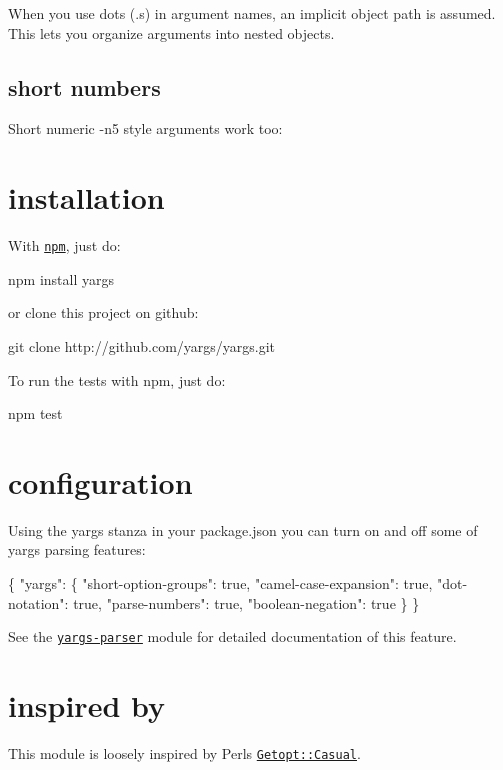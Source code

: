 When you use dots ({\ttfamily .}s) in argument names, an implicit object path is assumed. This lets you organize arguments into nested objects. 


\subsection*{short numbers }

Short numeric {\ttfamily -\/n5} style arguments work too\+: 


\section*{installation }

With \href{https://github.com/npm/npm}{\tt npm}, just do\+: \begin{DoxyVerb}npm install yargs
\end{DoxyVerb}


or clone this project on github\+: \begin{DoxyVerb}git clone http://github.com/yargs/yargs.git
\end{DoxyVerb}


To run the tests with npm, just do\+: \begin{DoxyVerb}npm test
\end{DoxyVerb}


\section*{configuration }

Using the {\ttfamily yargs} stanza in your {\ttfamily package.\+json} you can turn on and off some of yargs\textquotesingle{} parsing features\+:


\begin{DoxyCode}
\{
  "yargs": \{
    "short-option-groups": true,
    "camel-case-expansion": true,
    "dot-notation": true,
    "parse-numbers": true,
    "boolean-negation": true
  \}
\}
\end{DoxyCode}


See the \href{https://github.com/yargs/yargs-parser#configuration}{\tt yargs-\/parser} module for detailed documentation of this feature.

\section*{inspired by }

This module is loosely inspired by Perl\textquotesingle{}s \href{http://search.cpan.org/~photo/Getopt-Casual-0.13.1/Casual.pm}{\tt Getopt\+::\+Casual}. 